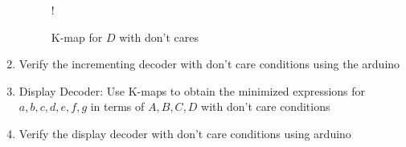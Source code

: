 \begin{enumerate}[label=\arabic*.,ref=\theenumi]
\begin{equation}
\end{equation}
\begin{figure}[!ht]
\resizebox {\columnwidth} {!} {

}
\caption{K-map for $D$ with don't cares}
\label{fig:kmap_D_x}
\end{figure}
%
\item Verify the incrementing decoder with don't care conditions using the arduino
\item {Display Decoder:}
Use K-maps to obtain the minimized expressions for $a,b,c,d,e,f,g$ in terms of $A,B,C,D$ with  don't care conditions
\item Verify the display decoder with don't care conditions using arduino
\end{enumerate}




